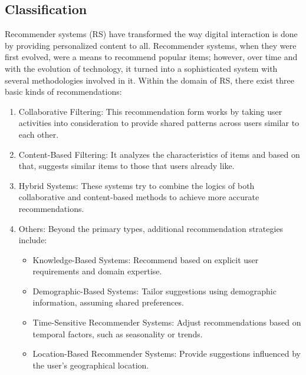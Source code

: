 \documentclass{article}
\begin{document}
\subsection{Classification}
Recommender systems (RS) have transformed the way digital interaction is done by providing personalized content to all. Recommender systems, when they were first evolved, were a means to recommend popular items; however, over time and with the evolution of technology, it turned into a sophisticated system with several methodologies involved in it. Within the domain of RS, there exist three basic kinds of recommendations: 
\begin{enumerate}
\item Collaborative Filtering: This recommendation form works by taking user activities  into consideration to provide shared patterns across users similar to each other. \cite{RS}
\item Content-Based Filtering: It analyzes the characteristics of items and based on that, suggests similar items to those that users already like. \cite{RS_AA_3}
\item Hybrid Systems: These systems try to combine the logics of both collaborative and content-based methods to achieve more accurate recommendations.\cite{RS}\cite{RS_AA_3}
\item Others: Beyond the primary types, additional recommendation strategies include:
    \begin{itemize}
    \item Knowledge-Based Systems: Recommend based on explicit user requirements and domain expertise.\cite{RS_AA_5}
    \item Demographic-Based Systems: Tailor suggestions using demographic information, assuming shared preferences.\cite{RS}
    \item Time-Sensitive Recommender Systems: Adjust recommendations based on temporal factors, such as seasonality or trends. \cite{RS}
    \item Location-Based Recommender Systems: Provide suggestions influenced by the user's geographical location.\cite{RS}
    \end{itemize}
\end{enumerate}
\clearpage
\end{document}
